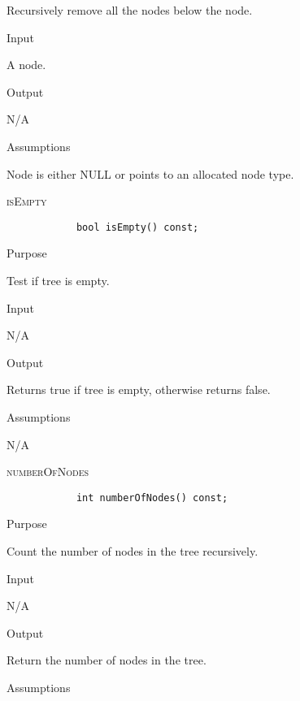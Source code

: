 \documentclass[pdftex, 12pt]{article}
\begin{document}
\begin{description}
\begin{description}
				Recursively remove all the nodes below the node.
			
			\item{Input}
			
				A node.

			\item{Output}

				N/A

			\item{Assumptions}

				Node is either NULL or points to an allocated node type.

		\end{description}
	\item{\textsc{isEmpty}}
		\begin{lstlisting}
			bool isEmpty() const;
		\end{lstlisting}
		\begin{description}

			\item{Purpose}

				Test if tree is empty.

			\item{Input}

				N/A

			\item{Output}

				Returns true if tree is empty, otherwise returns false.

			\item{Assumptions}

				N/A

		\end{description}
	\item{\textsc{numberOfNodes}}
		\begin{lstlisting}
			int numberOfNodes() const;
		\end{lstlisting}
		\begin{description}

			\item{Purpose}

				Count the number of nodes in the tree recursively.

			\item{Input}

				N/A

			\item{Output}

				Return the number of nodes in the tree.

			\item{Assumptions}


\end{description}
\end{description}
\end{document}

